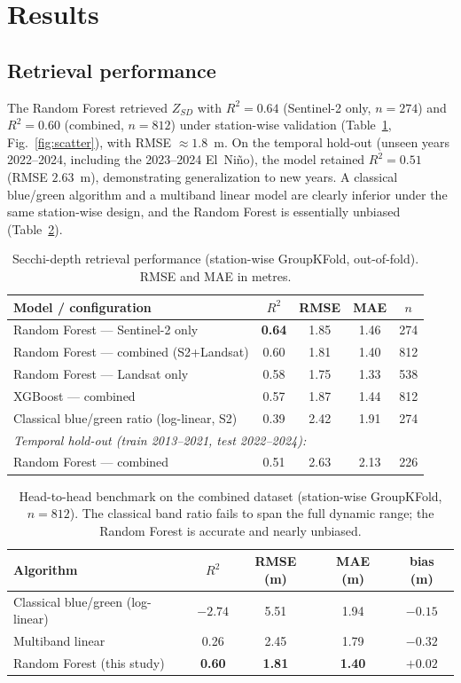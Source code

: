 \documentclass[11pt]{article}
\begin{document}
\section{Results}
\subsection{Retrieval performance}
The Random Forest retrieved $Z_{SD}$ with $R^2=0.64$ (Sentinel-2 only, $n=274$)
and $R^2=0.60$ (combined, $n=812$) under station-wise validation
(Table~\ref{tab:perf}, Fig.~\ref{fig:scatter}), with RMSE $\approx1.8$~m. On the
temporal hold-out (unseen years 2022--2024, including the 2023--2024 El~Ni\~no),
the model retained $R^2=0.51$ (RMSE $2.63$~m), demonstrating generalization to new
years. A classical blue/green algorithm and a multiband linear model are clearly
inferior under the same station-wise design, and the Random Forest is essentially
unbiased (Table~\ref{tab:benchmark}).

\begin{table}[htbp]\centering
\caption{Secchi-depth retrieval performance (station-wise GroupKFold, out-of-fold).
RMSE and MAE in metres.}
\label{tab:perf}
\begin{tabular}{lcccc}
\toprule
Model / configuration & $R^2$ & RMSE & MAE & $n$ \\
\midrule
Random Forest --- Sentinel-2 only      & \textbf{0.64} & 1.85 & 1.46 & 274 \\
Random Forest --- combined (S2+Landsat)& 0.60 & 1.81 & 1.40 & 812 \\
Random Forest --- Landsat only         & 0.58 & 1.75 & 1.33 & 538 \\
XGBoost --- combined                   & 0.57 & 1.87 & 1.44 & 812 \\
Classical blue/green ratio (log-linear, S2)& 0.39 & 2.42 & 1.91 & 274 \\
\midrule
\multicolumn{5}{l}{\emph{Temporal hold-out (train 2013--2021, test 2022--2024):}}\\
Random Forest --- combined             & 0.51 & 2.63 & 2.13 & 226 \\
\bottomrule
\end{tabular}
\end{table}

\begin{table}[htbp]\centering
\caption{Head-to-head benchmark on the combined dataset (station-wise GroupKFold,
$n=812$). The classical band ratio fails to span the full dynamic range; the
Random Forest is accurate and nearly unbiased.}
\label{tab:benchmark}
\begin{tabular}{lcccc}
\toprule
Algorithm & $R^2$ & RMSE (m) & MAE (m) & bias (m) \\
\midrule
Classical blue/green (log-linear) & $-2.74$ & 5.51 & 1.94 & $-0.15$ \\
Multiband linear                  & 0.26 & 2.45 & 1.79 & $-0.32$ \\
Random Forest (this study)        & \textbf{0.60} & \textbf{1.81} & \textbf{1.40} & $+0.02$ \\
\bottomrule
\end{tabular}
\end{table}
\end{document}
